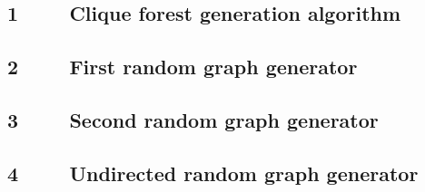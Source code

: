 \documentclass[12pt]{article}
\begin{document}
\setcounter{figure}{0}
\subsection*{1 \ \ \ \ Clique forest generation algorithm}
\begin{figure}[h!]
  
\end{figure}

\newpage

\subsection*{2 \ \ \ \ First random graph generator}
\begin{figure}[h!]
  
\end{figure}

\newpage

\subsection*{3 \ \ \ \ Second random graph generator}
\begin{figure}[h!]
  
\end{figure}

\newpage

\subsection*{4 \ \ \ \ Undirected random graph generator}
\begin{figure}[h!]
  
\end{figure}
\end{document}
